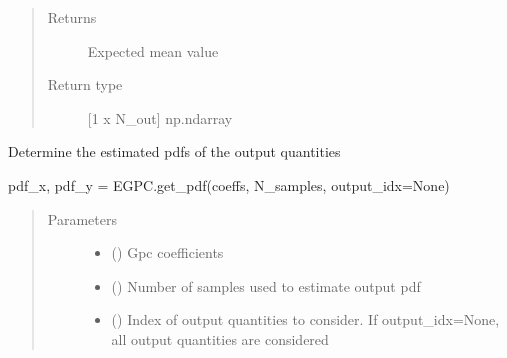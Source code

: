 \documentclass[letterpaper,10pt,english,openany,oneside]{sphinxmanual}
\begin{document}
\begin{fulllineitems}
\begin{fulllineitems}
\begin{quote}
\begin{description}
\item[{Returns}] \leavevmode
{} \textendash{} Expected mean value

\item[{Return type}] \leavevmode
{[}1 x N\_out{]} np.ndarray

\end{description}\end{quote}

\end{fulllineitems}


\begin{fulllineitems}
\label{\detokenize{pygpc:pygpc.EGPC.EGPC.get_pdf}}
Determine the estimated pdfs of the output quantities

pdf\_x, pdf\_y = EGPC.get\_pdf(coeffs, N\_samples, output\_idx=None)
\begin{quote}\begin{description}
\item[{Parameters}] \leavevmode\begin{itemize}
\item {} 
 (\sphinxstyleliteralemphasis{\sphinxupquote{{[}}}\sphinxstyleliteralemphasis{\sphinxupquote{{]} }}) \textendash{} Gpc coefficients

\item {} 
 () \textendash{} Number of samples used to estimate output pdf

\item {} 
 (\sphinxstyleliteralemphasis{\sphinxupquote{{[}}}\sphinxstyleliteralemphasis{\sphinxupquote{{]} }}\sphinxstyleliteralemphasis{\sphinxupquote{, }}\sphinxstyleliteralemphasis{\sphinxupquote{, }}) \textendash{} Index of output quantities to consider.
If output\_idx=None, all output quantities are considered


\end{itemize}
\end{description}
\end{quote}
\end{fulllineitems}
\end{fulllineitems}
\end{document}

